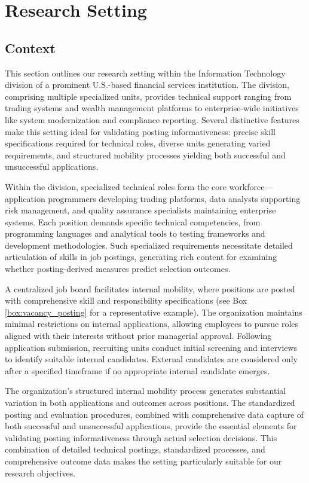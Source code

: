\section{Research Setting}\label{sec:research_setting}

\subsection{Context}

This section outlines our research setting within the Information Technology division of a prominent U.S.-based financial services institution. The division, comprising multiple specialized units, provides technical support ranging from trading systems and wealth management platforms to enterprise-wide initiatives like system modernization and compliance reporting. Several distinctive features make this setting ideal for validating posting informativeness: precise skill specifications required for technical roles, diverse units generating varied requirements, and structured mobility processes yielding both successful and unsuccessful applications.

Within the division, specialized technical roles form the core workforce---application programmers developing trading platforms, data analysts supporting risk management, and quality assurance specialists maintaining enterprise systems. Each position demands specific technical competencies, from programming languages and analytical tools to testing frameworks and development methodologies. Such specialized requirements necessitate detailed articulation of skills in job postings, generating rich content for examining whether posting-derived measures predict selection outcomes.

A centralized job board facilitates internal mobility, where positions are posted with comprehensive skill and responsibility specifications (see Box \ref{box:vacancy_posting} for a representative example). The organization maintains minimal restrictions on internal applications, allowing employees to pursue roles aligned with their interests without prior managerial approval. Following application submission, recruiting units conduct initial screening and interviews to identify suitable internal candidates. External candidates are considered only after a specified timeframe if no appropriate internal candidate emerges.

The organization's structured internal mobility process generates substantial variation in both applications and outcomes across positions. The standardized posting and evaluation procedures, combined with comprehensive data capture of both successful and unsuccessful applications, provide the essential elements for validating posting informativeness through actual selection decisions. This combination of detailed technical postings, standardized processes, and comprehensive outcome data makes the setting particularly suitable for our research objectives.


